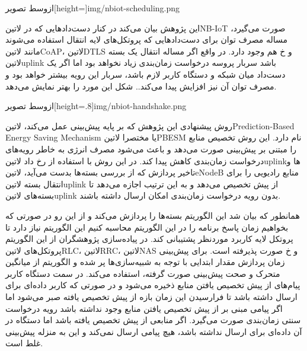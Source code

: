 ‌ازوسط
‌تصویر[height=\textwidth]{img/nbiot-scheduling.png}

این پژوهش بیان می‌کند در کنار دست‌دادهایی که در ‌لاتین{NB-IoT} صورت می‌گیرد، مساله مصرف توان برای دست‌دادهایی که پروتکل‌های لایه انتقال
استفاده می‌شوند مانند ‌لاتین{CoAP}، ‌لاتین{DTLS} و ‌خ هم وجود دارد.
در واقع اگر مساله انتقال یک بسته ‌لاتین{uplink} باشد سربار پروسه درخواست زمان‌بندی زیاد نخواهد بود اما اگر یک دست‌داد میان شبکه و دستگاه
کاربر لازم باشد، سربار این رویه بیشتر خواهد بود و مصرف توان آن نیز افزایش پیدا می‌کند.. شکل  این مورد را بهتر نمایش می‌دهد.

‌ازوسط
‌تصویر[height=.8\textwidth]{img/nbiot-handshake.png}

روش پیشنهادی این پژوهش که بر پایه پیش‌بینی عمل می‌کند، ‌لاتین{Prediction-Based Energy Saving Mechanism} یا مختصرا ‌لاتین{PBESM} نام دارد.
این روش تخصیص منابع را مبتنی بر پیش‌بینی صورت می‌دهد و باعث می‌شود مصرف انرژی به خاطر رویه‌های درخواست زمان‌بندی کاهش پیدا کند.
در این روش با استفاده از رخ داد ‌لاتین{uplink}ها و تاخیر پردازش که از بررسی بسته‌ها بدست می‌آید، ‌لاتین{eNodeB}
منابع رادیویی را برای انتقال بسته ‌لاتین{uplink} از پیش تخصیص می‌دهد و به این ترتیب اجازه می‌دهد تا بسته‌های ‌لاتین{uplink}
بدون رویه درخواست زمان‌بندی امکان ارسال داشته باشند.

همانطور که بیان شد این الگوریتم بسته‌ها را پردازش می‌کند و از این رو در صورتی که بخواهیم زمان پاسخ برنامه را در این الگوریتم محاسبه کنیم این الگوریتم نیاز دارد تا پروتکل لایه کاربرد
موردنظر پشتیبانی کند. در پیاده‌سازی پژوهشگران از این الگوریتم پروتکل‌های ‌لاتین{RLC}، ‌لاتین{RRC}، ‌لاتین{NAS} و ‌خ صورت پذیرفته است.
برای پیش‌بینی زمان پردازش مقدار ابتدایی با توجه به شبیه‌سازی‌ها پر شده و الگوریتم از میانگین متحرک و صحت پیش‌بینی صورت گرفته، استفاده می‌کند.
در سمت دستگاه کاربر پیام‌های از پیش تخصیص یافتن منابع ذخیره می‌شود و در صورتی که کاربر داده‌ای برای ارسال داشته باشد تا فرارسیدن این زمان بازه از پیش تخصیص یافته
صبر می‌شود اما اگر پیامی مبنی بر از پیش تخصیص یافتن منابع وجود نداشته باشد رویه درخواست سنتی زمان‌بندی صورت می‌گیرد. اگر منابعی از پیش تخصیص یافته باشد اما دستگاه
در آن داده‌ای برای ارسال نداشته باشد، هیچ پیامی ارسال نمی‌کند و این به منزله پیش‌بینی غلط است.


